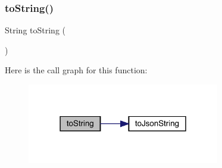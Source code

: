 \subsubsection{\texorpdfstring{to\+String()}{toString()}}
{\footnotesize\ttfamily String to\+String (\begin{DoxyParamCaption}{ }\end{DoxyParamCaption})\hspace{0.3cm}{\ttfamily [inherited]}}

Here is the call graph for this function\+:
\nopagebreak
\begin{figure}[H]
\begin{center}
\leavevmode
\includegraphics[width=238pt]{classcom_1_1toast_1_1android_1_1gamebase_1_1base_1_1_value_object_ad146fa8579a5f8a876c4688cc5a68520_cgraph}
\end{center}
\end{figure}
